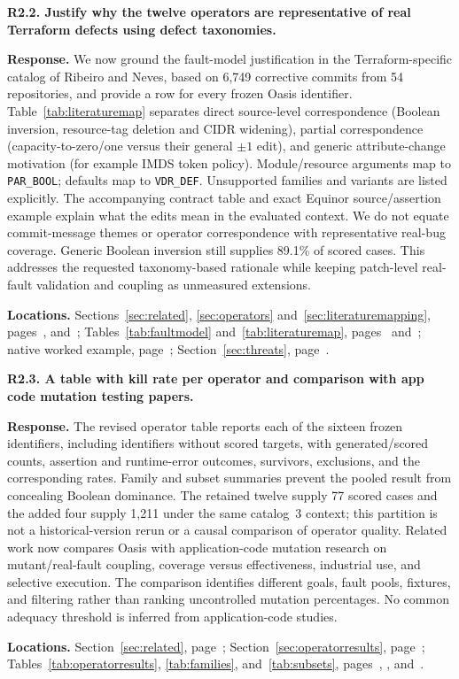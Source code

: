 \medskip
\noindent\textbf{R2.2. Justify why the twelve operators are representative of real Terraform defects using defect taxonomies.}\label{response:R2.2}\par
\textbf{Response.} We now ground the fault-model justification in the Terraform-specific catalog of Ribeiro and Neves, based on 6,749 corrective commits from 54 repositories, and provide a row for every frozen Oasis identifier. Table~\ref{tab:literaturemap} separates direct source-level correspondence (Boolean inversion, resource-tag deletion and CIDR widening), partial correspondence (capacity-to-zero/one versus their general $\pm1$ edit), and generic attribute-change motivation (for example IMDS token policy). Module/resource arguments map to \texttt{PAR\_BOOL}; defaults map to \texttt{VDR\_DEF}. Unsupported families and variants are listed explicitly. The accompanying contract table and exact Equinor source/assertion example explain what the edits mean in the evaluated context. We do not equate commit-message themes or operator correspondence with representative real-bug coverage. Generic Boolean inversion still supplies 89.1\% of scored cases. This addresses the requested taxonomy-based rationale while keeping patch-level real-fault validation and coupling as unmeasured extensions.\par
\textbf{Locations.} Sections~\ref{sec:related}, \ref{sec:operators} and~\ref{sec:literaturemapping}, pages~\pageref{sec:related}, \pageref{sec:operators} and~\pageref{sec:literaturemapping}; Tables~\ref{tab:faultmodel} and~\ref{tab:literaturemap}, pages~\pageref{tab:faultmodel} and~\pageref{tab:literaturemap}; native worked example, page~\pageref{sec:workedexample}; Section~\ref{sec:threats}, page~\pageref{sec:threats}.

\medskip
\noindent\textbf{R2.3. A table with kill rate per operator and comparison with app code mutation testing papers.}\label{response:R2.3}\par
\textbf{Response.} The revised operator table reports each of the sixteen frozen identifiers, including identifiers without scored targets, with generated/scored counts, assertion and runtime-error outcomes, survivors, exclusions, and the corresponding rates. Family and subset summaries prevent the pooled result from concealing Boolean dominance. The retained twelve supply 77 scored cases and the added four supply 1,211 under the same catalog~3 context; this partition is not a historical-version rerun or a causal comparison of operator quality. Related work now compares Oasis with application-code mutation research on mutant/real-fault coupling, coverage versus effectiveness, industrial use, and selective execution. The comparison identifies different goals, fault pools, fixtures, and filtering rather than ranking uncontrolled mutation percentages. No common adequacy threshold is inferred from application-code studies.\par
\textbf{Locations.} Section~\ref{sec:related}, page~\pageref{sec:related}; Section~\ref{sec:operatorresults}, page~\pageref{sec:operatorresults}; Tables~\ref{tab:operatorresults}, \ref{tab:families}, and~\ref{tab:subsets}, pages~\pageref{tab:operatorresults}, \pageref{tab:families}, and~\pageref{tab:subsets}.

